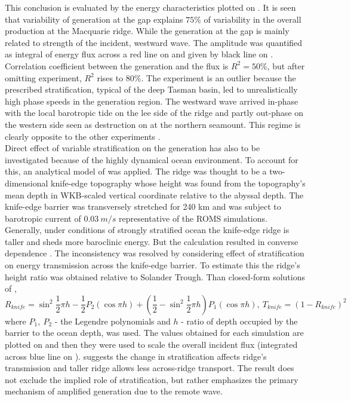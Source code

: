 \documentclass[12pt]{article}
\begin{document}
This conclusion is evaluated by the energy characteristics plotted on 
. It is seen that variability of generation at the gap explains  
$75\%$ of variability in the overall production at the Macquarie ridge. While the generation at the 
gap is mainly related to strength of the incident, westward wave. The amplitude was 
quantified as integral of energy flux across a red line on  and 
given by black line on . Correlation coefficient between the 
generation and the flux is $R^2 = 50\%$, but after omitting  experiment, $R^2$ rises 
to $80\%$. The  experiment is an outlier because the prescribed stratification,  
typical of the deep Tasman basin, led to unrealistically high phase speeds in the 
generation region. The westward wave arrived in-phase with the local barotropic tide on the 
lee side of the ridge and partly out-phase on the western side seen as destruction on 
 at the northern seamount. This regime 
is clearly opposite to the other experiments .\\

Direct effect of variable stratification on the generation has also to be investigated because of 
the highly dynamical ocean environment. To account for this, an analytical model of 
\cite{st2003generation} was applied. The ridge was thought to be a two-dimensional knife-edge 
topography whose height was found from the topography's mean depth in WKB-scaled vertical 
coordinate \citep{althaus2003internal} relative to the abyssal depth. The knife-edge barrier was  
transversely stretched for 240 km and was subject to barotropic current of $0.03~m/s$ 
representative of the ROMS simulations. Generally, under conditions of strongly stratified ocean 
the knife-edge ridge is taller and sheds more baroclinic energy. But the calculation resulted in 
converse dependence . The inconsistency was resolved by 
considering effect of stratification on energy transmission across the knife-edge barrier. To 
estimate this the ridge's height ratio was obtained relative to Solander Trough. Than closed-form 
solutions of \citep{larsen1969internal},
\begin{equation}
\label{C3.eq:ke_transm}
R_{knife} = \sin^2 \frac{1}{2} \pi h - \frac{1}{2} P_2( \cos \pi h ) + (\frac{1}{2} - \sin^2 
\frac{1}{2} \pi h) P_1( \cos \pi h ),~
T_{knife} = (1 - R_{knife})^2
\end{equation}
where $P_1,~P_2$ - the Legendre polynomials and $h$ - ratio of depth occupied by the barrier to 
the ocean depth, was used. The values obtained for each simulation are plotted on 
 and then they were used to scale the overall 
incident flux (integrated across blue line on ). 
 suggests the change in stratification affects ridge's transmission 
and taller ridge allows less across-ridge transport. The result does not exclude the implied role 
of stratification, but rather emphasizes the primary mechanism of amplified generation due to the 
remote wave.\\
\end{document}

